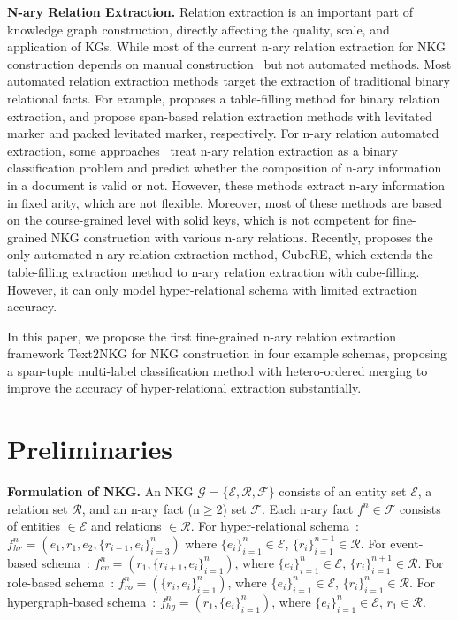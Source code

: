 \documentclass{article} \usepackage{iclr2024_conference,times}
\begin{document}
\textbf{N-ary Relation Extraction. }
Relation extraction is an important part of knowledge graph construction, directly affecting the quality, scale, and application of KGs. While most of the current n-ary relation extraction for NKG construction depends on manual construction~\citep{m-TransH,NaLP,StarE} but not automated methods. Most automated relation extraction methods target the extraction of traditional binary relational facts. For example, \cite{table-filling} proposes a table-filling method for binary relation extraction, and \cite{PURE,PL-Marker} propose span-based relation extraction methods with levitated marker and packed levitated marker, respectively. 
For n-ary relation automated extraction, some approaches~\citep{documentlevelNRE,Document2,Document3} treat n-ary relation extraction as a binary classification problem and predict whether the composition of n-ary information in a document is valid or not. However, these methods extract n-ary information in fixed arity, which are not flexible. Moreover, most of these methods are based on the course-grained level with solid keys, which is not competent for fine-grained NKG construction with various n-ary relations. Recently, \cite{HyperRED} proposes the only automated n-ary relation extraction method, CubeRE, which extends the table-filling extraction method to n-ary relation extraction with cube-filling. However, it can only model hyper-relational schema with limited extraction accuracy.

In this paper, we propose the first fine-grained n-ary relation extraction framework Text2NKG for NKG construction in four example schemas, proposing a span-tuple multi-label classification method with hetero-ordered merging to improve the accuracy of hyper-relational extraction substantially.



\section{Preliminaries}
\textbf{Formulation of NKG. } 
An NKG $\mathcal{G}=\{\mathcal{E},\mathcal{R},\mathcal{F}\}$ consists of an entity set $\mathcal{E}$, a relation set $\mathcal{R}$, and an n-ary fact (n$\geq$2) set $\mathcal{F}$. Each n-ary fact $f^n \in \mathcal{F}$ consists of entities $\in \mathcal{E}$ and relations $\in \mathcal{R}$.
For hyper-relational schema~\citep{Hinge}: $f^n_{hr}=(e_1,r_1,e_2,\{r_{i-1},e_i\}_{i=3}^{n}) $ where $\{e_i\}_{i=1}^{n}\in \mathcal{E}$, $\{r_i\}_{i=1}^{n-1}\in \mathcal{R}$.
For event-based schema~\citep{Text2Event}: $f^n_{ev}=(r_1,\{r_{i+1},e_i\}_{i=1}^{n})$, where $\{e_i\}_{i=1}^{n}\in \mathcal{E}$, $\{r_i\}_{i=1}^{n+1}\in \mathcal{R}$. 
For role-based schema~\citep{NaLP}: $f^n_{ro}=(\{r_i,e_i\}_{i=1}^{n})$, where $\{e_i\}_{i=1}^{n}\in \mathcal{E}$, $\{r_i\}_{i=1}^{n}\in \mathcal{R}$.
For hypergraph-based schema~\citep{m-TransH}: $f^n_{hg}=(r_1,\{e_i\}_{i=1}^{n})$, where $\{e_i\}_{i=1}^{n}\in \mathcal{E}$, $r_1\in \mathcal{R}$.
\end{document}

